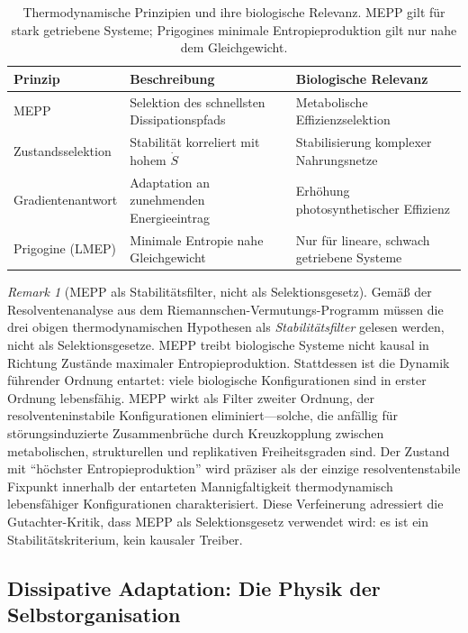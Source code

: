 \documentclass[12pt,a4paper]{article}
\theoremstyle{remark}
\newtheorem{remark}{Remark}
\begin{document}
\begin{table}[ht]
\centering
\caption{Thermodynamische Prinzipien und ihre biologische Relevanz. MEPP gilt f\"ur stark getriebene Systeme; Prigogines minimale Entropieproduktion gilt nur nahe dem Gleichgewicht.}
\label{tab:thermo-principles}
\begin{tabular}{lll}
\toprule
\textbf{Prinzip} & \textbf{Beschreibung} & \textbf{Biologische Relevanz} \\
\midrule
MEPP & Selektion des schnellsten Dissipationspfads & Metabolische Effizienzselektion \\
Zustandsselektion & Stabilit\"at korreliert mit hohem $\dot{S}$ & Stabilisierung komplexer Nahrungsnetze \\
Gradientenantwort & Adaptation an zunehmenden Energieeintrag & Erh\"ohung photosynthetischer Effizienz \\
Prigogine (LMEP) & Minimale Entropie nahe Gleichgewicht & Nur f\"ur lineare, schwach getriebene Systeme \\
\bottomrule
\end{tabular}
\end{table}

\begin{remark}[MEPP als Stabilit\"atsfilter, nicht als Selektionsgesetz]
\label{rem:mepp-stability-biology}
Gem\"a\ss{} der Resolventenanalyse aus dem Riemannschen-Vermutungs-Programm \citep{FST-RH2} m\"ussen die drei obigen thermodynamischen Hypothesen als \emph{Stabilit\"atsfilter} gelesen werden, nicht als Selektionsgesetze. MEPP treibt biologische Systeme nicht kausal in Richtung Zust\"ande maximaler Entropieproduktion. Stattdessen ist die Dynamik f\"uhrender Ordnung entartet: viele biologische Konfigurationen sind in erster Ordnung lebensfähig. MEPP wirkt als Filter zweiter Ordnung, der resolventeninstabile Konfigurationen eliminiert---solche, die anf\"allig f\"ur st\"orungsinduzierte Zusammenbr\"uche durch Kreuzkopplung zwischen metabolischen, strukturellen und replikativen Freiheitsgraden sind. Der Zustand mit ``h\"ochster Entropieproduktion'' wird pr\"aziser als der einzige resolventenstabile Fixpunkt innerhalb der entarteten Mannigfaltigkeit thermodynamisch lebensfähiger Konfigurationen charakterisiert. Diese Verfeinerung adressiert die Gutachter-Kritik, dass MEPP als Selektionsgesetz verwendet wird: es ist ein Stabilit\"atskriterium, kein kausaler Treiber.
\end{remark}

\subsection{Dissipative Adaptation: Die Physik der Selbstorganisation}
\end{document}
